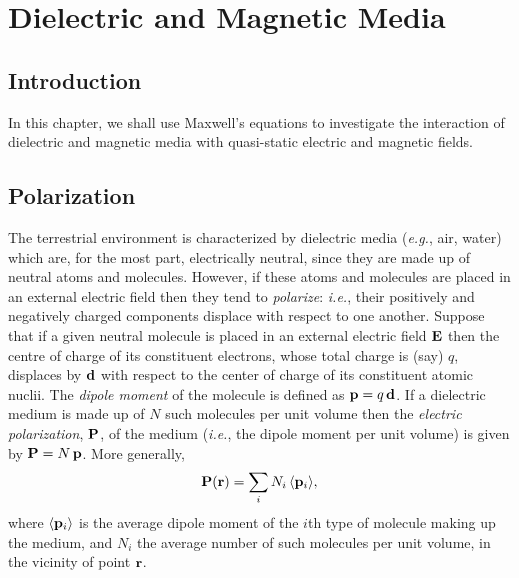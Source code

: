 \chapter{Dielectric and Magnetic Media}\label{dielectric}
\section{Introduction}
In this chapter, we shall use Maxwell's equations to investigate the interaction
of dielectric and magnetic media with quasi-static electric and magnetic fields.

\section{Polarization}\label{spolz}
The terrestrial environment is characterized by 
dielectric media ({\em e.g.},
air, water) which are, for the most part, electrically neutral, since  they
are made up  of neutral atoms and molecules. However, if these
atoms and
molecules are placed in an external electric field then they tend to {\em polarize}: {\em i.e.}, their positively and negatively charged
components displace with respect to one another.
Suppose that if a given neutral molecule is placed in an external  electric
field ${\bf E}$ then the centre of charge of its 
constituent electrons, whose total
charge is (say) $q$, displaces by ${\bf d}$ with respect
to the center of charge of its constituent
atomic nuclii. The {\em dipole moment}\/
of the molecule is defined as ${\bf p} = q \,{\bf d}$. If a dielectric medium is made up of 
$N$ such molecules per unit volume then the {\em electric polarization},
${\bf P}$, of the medium ({\em i.e.}, the dipole moment per unit volume) is
given by ${\bf P} = N \,{\bf p}$. More generally,
\begin{equation}
{\bf P}({\bf r}) = \sum_i N_i \,\langle {\bf p}_i\rangle,
\end{equation}
where $\langle {\bf p}_i\rangle$ is the
average  dipole moment of the $i$th type of molecule making up the  medium,
and $N_i$ the average number of such molecules per unit volume, in the vicinity of point ${\bf r}$.

